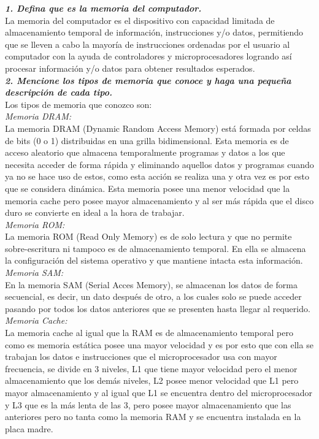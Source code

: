 \documentclass{article}
\begin{document}
\textbf {\textit{ 1. Defina que es la memoria del computador.}}\\
La memoria del computador es el dispositivo con capacidad limitada de almacenamiento temporal de información, instrucciones y/o datos,  permitiendo que se lleven a cabo la mayoría de instrucciones ordenadas por el usuario al computador con la ayuda de controladores y microprocesadores logrando así procesar información y/o datos  para obtener resultados esperados.\\

\textbf {\textit{2. Mencione los tipos de memoria que conoce y haga una pequeña descripción de cada tipo.}}\\
Los tipos de memoria que conozco son: \\

\textit{Memoria DRAM:}\\ 
La memoria DRAM (Dynamic Random Access Memory) está formada por celdas de bits (0 o 1) distribuidas en una grilla bidimensional. Esta memoria es de acceso aleatorio que almacena temporalmente programas y datos a los que necesita acceder de forma rápida y eliminando aquellos datos y programas cuando ya no se hace uso de estos, como esta acción se realiza una y otra vez es por esto que se considera dinámica. Esta memoria posee una menor velocidad que la memoria cache pero posee mayor almacenamiento y al ser más rápida que el disco duro se convierte en ideal a la hora de trabajar.\\

\textit{Memoria ROM:}\\ 
La memoria ROM (Read Only Memory) es de solo lectura y que no permite sobre-escritura ni tampoco es de almacenamiento temporal. En ella se almacena la configuración del sistema operativo y que mantiene intacta esta información.\\

\textit{Memoria SAM:}\\ 
En la memoria SAM (Serial Acces Memory), se almacenan los datos de forma secuencial, es decir, un dato después de otro, a los cuales solo se puede acceder pasando por todos los datos anteriores que se presenten hasta llegar al requerido.\\

\textit{Memoria Cache:}\\ 
La memoria cache al igual que la RAM es de almacenamiento temporal pero como es memoria estática posee una mayor velocidad y es por esto que  con ella se trabajan los datos e instrucciones que el microprocesador usa con mayor frecuencia, se divide en 3 niveles, L1 que tiene mayor velocidad pero el menor almacenamiento que los demás niveles, L2 posee menor velocidad que L1 pero mayor almacenamiento y al igual que L1 se encuentra dentro del microprocesador y L3 que es la más lenta de las 3, pero posee mayor almacenamiento que las anteriores pero no tanta como la memoria RAM y se encuentra instalada en la placa madre.\\
\end{document}
